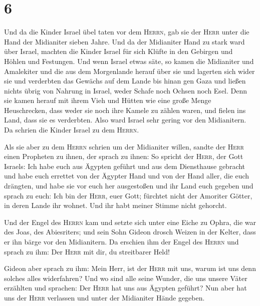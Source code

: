 \hypertarget{section-1}{%
\section{6}\label{section-1}}

 Und da die Kinder Israel übel taten vor dem
\textsc{Herrn}, gab sie der \textsc{Herr} unter die Hand der Midianiter
sieben Jahre.  Und da der Midianiter Hand zu stark ward
über Israel, machten die Kinder Israel für sich Klüfte in den Gebirgen
und Höhlen und Festungen.  Und wenn Israel etwas säte, so
kamen die Midianiter und Amalekiter und die aus dem Morgenlande herauf
über sie  und lagerten sich wider sie und verderbten das
Gewächs auf dem Lande bis hinan gen Gaza und ließen nichts übrig von
Nahrung in Israel, weder Schafe noch Ochsen noch Esel. 
Denn sie kamen herauf mit ihrem Vieh und Hütten wie eine große Menge
Heuschrecken, dass weder sie noch ihre Kamele zu zählen waren, und
fielen ins Land, dass sie es verderbten.  Also ward Israel
sehr gering vor den Midianitern. Da schrien die Kinder Israel zu dem
\textsc{Herrn}.

 Als sie aber zu dem \textsc{Herrn} schrien um der
Midianiter willen,  sandte der \textsc{Herr} einen
Propheten zu ihnen, der sprach zu ihnen: So spricht der \textsc{Herr},
der Gott Israels: Ich habe euch aus Ägypten geführt und aus dem
Diensthause gebracht  und habe euch errettet von der
Ägypter Hand und von der Hand aller, die euch drängten, und habe sie vor
euch her ausgestoßen und ihr Land euch gegeben  und
sprach zu euch: Ich bin der \textsc{Herr}, euer Gott; fürchtet nicht der
Amoriter Götter, in deren Lande ihr wohnet. Und ihr habt meiner Stimme
nicht gehorcht.

 Und der Engel des \textsc{Herrn} kam und setzte sich
unter eine Eiche zu Ophra, die war des Joas, des Abiesriters; und sein
Sohn Gideon drosch Weizen in der Kelter, dass er ihn bärge vor den
Midianitern.  Da erschien ihm der Engel des
\textsc{Herrn} und sprach zu ihm: Der \textsc{Herr} mit dir, du
streitbarer Held!

 Gideon aber sprach zu ihm: Mein Herr, ist der
\textsc{Herr} mit uns, warum ist uns denn solches alles widerfahren? Und
wo sind alle seine Wunder, die uns unsere Väter erzählten und sprachen:
Der \textsc{Herr} hat uns aus Ägypten geführt? Nun aber hat uns der
\textsc{Herr} verlassen und unter der Midianiter Hände gegeben.

